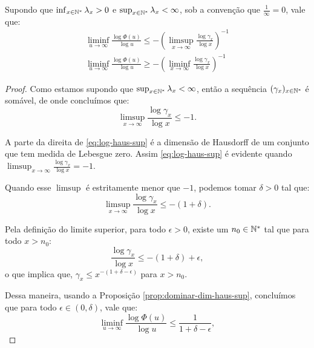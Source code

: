 \begin{corolario}
  \label{cor:log-haus}
  Supondo que $\inf_{x \in {\mathbb{N^*}}} \lambda_x > 0$ e $\sup_{x \in {\mathbb{N^*}}}
  \lambda_x < \infty$, sob a convenção que $\frac{1}{\infty} = 0$,
  vale que:
  \begin{gather}
    \label{eq:log-haus-sup}
    \liminf_{u \to \infty} \frac{\log \Phi(u)}{\log u} \leq
    - \left( \limsup_{x \to \infty} \frac{\log \gamma_x}{\log x}
    \right)^{-1} \\
    \label{eq:log-haus-inf}
    \liminf_{u \to \infty} \frac{\log \Phi(u)}{\log u} \geq
    - \left( \liminf_{x \to \infty} \frac{\log \gamma_x}{\log x}
    \right)^{-1}
  \end{gather}
\end{corolario}
\begin{proof}
  Como estamos supondo que $\sup_{x \in {\mathbb{N^*}}} \lambda_x < \infty$,
  então a sequência $(\gamma_x)_{x\in{\mathbb{N^*}}}$ é somável, de onde
  concluímos que:
  \begin{displaymath}
    \limsup_{x \to \infty} \frac{\log \gamma_x}{\log x}
    \leq -1.
  \end{displaymath}

  A parte da direita de \eqref{eq:log-haus-sup} é a dimensão de
  Hausdorff de um conjunto que tem medida de Lebesgue zero. Assim
  \eqref{eq:log-haus-sup} é evidente quando
  $\displaystyle \limsup_{x \to \infty} \frac{\log \gamma_x}{\log x} =
  -1$.

  Quando esse $\limsup$ é estritamente menor que $-1$,
  podemos tomar $\delta > 0$ tal que:
  \begin{equation}
    \label{eq:log-haus-delta}
    \limsup_{x \to \infty} \frac{\log \gamma_x}{\log x} \leq -(1
    + \delta).
  \end{equation}
  
  Pela definição do limite superior, para todo $\epsilon > 0$, existe
  um $n_0 \in {\mathbb{N^*}}$ tal que para todo $x > n_0$:
  \begin{displaymath}
    \frac{\log \gamma_x}{\log x} \leq -(1+\delta) + \epsilon,
  \end{displaymath}
  o que implica que, $ \gamma_x \leq x^{-(1+\delta-\epsilon)}$ para $x
  > n_0$.

  Dessa maneira, usando a Proposição \ref{prop:dominar-dim-haus-sup},
  concluímos que para todo $\epsilon \in (0, \delta)$, vale que:
  \begin{displaymath}
    \liminf_{u \to \infty} \frac{\log \Phi(u)}{\log u} \leq
    \frac{1}{1+\delta-\epsilon},
  \end{displaymath}
  

\end{proof}
